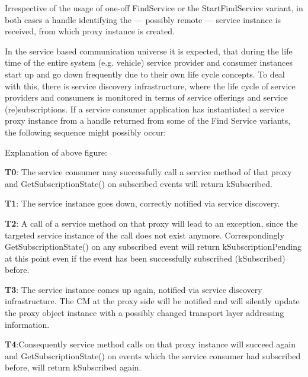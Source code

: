 \begin{DoxyItemize}
\item Irrespective of the usage of one-\/off Find\+Service or the Start\+Find\+Service variant, in both cases a handle identifying the — possibly remote — service instance is received, from which proxy instance is created.
\item In the service based communication universe it is expected, that during the life time of the entire system (e.\+g. vehicle) service provider and consumer instances start up and go down frequently due to their own life cycle concepts. To deal with this, there is service discovery infrastructure, where the life cycle of service providers and consumers is monitored in terms of service offerings and service (re)subscriptions. If a service consumer application has instantiated a service proxy instance from a handle returned from some of the Find Service variants, the following sequence might possibly occur\+:
\end{DoxyItemize}


\begin{DoxyItemize}
\item Explanation of above figure\+:
\begin{DoxyItemize}
\item {\bfseries T0}\+: The service consumer may successfully call a service method of that proxy and Get\+Subscription\+State() on subscribed events will return k\+Subscribed.
\item {\bfseries T1}\+: The service instance goes down, correctly notified via service discovery.
\item {\bfseries T2}\+: A call of a service method on that proxy will lead to an exception, since the targeted service instance of the call does not exist anymore. Correspondingly Get\+Subscription\+State() on any subscribed event will return k\+Subscription\+Pending at this point even if the event has been successfully subscribed (k\+Subscribed) before.
\item {\bfseries T3}\+: The service instance comes up again, notified via service discovery infrastructure. The CM at the proxy side will be notified and will silently update the proxy object instance with a possibly changed transport layer addressing information.
\item {\bfseries T4}\+:Consequently service method calls on that proxy instance will succeed again and Get\+Subscription\+State() on events which the service consumer had subscribed before, will return k\+Subscribed again.
\end{DoxyItemize}
\end{DoxyItemize}

